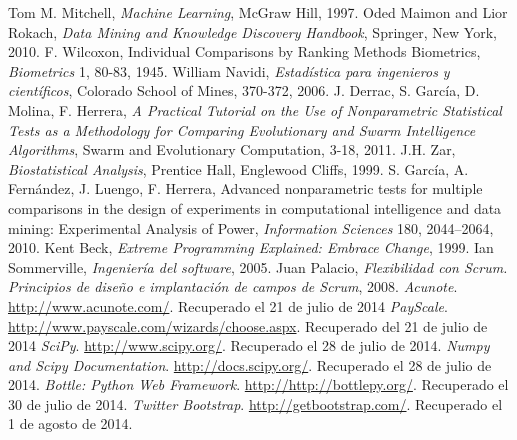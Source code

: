 
\begin{thebibliography}{99}
 Tom M. Mitchell, \textit{Machine Learning}, McGraw Hill, 1997.
 Oded Maimon and Lior Rokach, \textit{Data Mining and Knowledge Discovery Handbook}, Springer, New York, 2010.
 F. Wilcoxon, Individual Comparisons by Ranking Methods Biometrics, \textit{Biometrics} 1, 80-83, 1945.
 William Navidi, \textit{Estadística para ingenieros y científicos}, Colorado School of Mines, 370-372, 2006.
 J. Derrac, S. García, D. Molina, F. Herrera, \textit{A Practical Tutorial on the Use of Nonparametric Statistical Tests as a Methodology for Comparing Evolutionary and Swarm Intelligence Algorithms}, Swarm and Evolutionary Computation, 3-18, 2011.
 J.H. Zar, \textit{Biostatistical Analysis}, Prentice Hall, Englewood Cliffs, 1999.
 S. García, A. Fernández, J. Luengo, F. Herrera, Advanced nonparametric tests for multiple comparisons in the design of experiments in computational intelligence and data mining: Experimental Analysis of Power, \textit{Information Sciences} 180, 2044–2064, 2010.
 Kent Beck, \textit{Extreme Programming Explained: Embrace Change}, 1999.
 Ian Sommerville, \textit{Ingeniería del software}, 2005.
 Juan Palacio, \textit{Flexibilidad con Scrum. Principios de diseño e implantación de campos de Scrum}, 2008.
 \textit{Acunote}. \url{http://www.acunote.com/}. Recuperado el 21 de julio de 2014
 \textit{PayScale}. \url{http://www.payscale.com/wizards/choose.aspx}. Recuperado del 21 de julio de 2014
 \textit{SciPy}. \url{http://www.scipy.org/}. Recuperado el 28 de julio de 2014.
 \textit{Numpy and Scipy Documentation}. \url{http://docs.scipy.org/}. Recuperado el 28 de julio de 2014.
 \textit{Bottle: Python Web Framework}. \url{http://http://bottlepy.org/}. Recuperado el 30 de julio de 2014.
 \textit{Twitter Bootstrap}. \url{http://getbootstrap.com/}. Recuperado el 1 de agosto de 2014.

\end{thebibliography}

